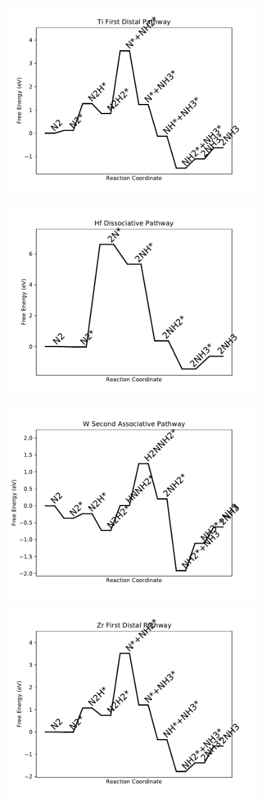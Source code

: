 \documentclass[journal=jacsat,manuscript=article]{achemso}
\begin{document}
\begin{figure}
\includegraphics[width=0.5\linewidth]{data/plots/Ti_distal_1.pdf}
\label{fig:Ti_distal_1}
\end{figure}

\begin{figure}
\includegraphics[width=0.5\linewidth]{data/plots/Hf_dissociative.pdf}
\label{fig:Hf_dissociative}
\end{figure}

\begin{figure}
\includegraphics[width=0.5\linewidth]{data/plots/W_associative_2.pdf}
\label{fig:W_associative_2}
\end{figure}

\begin{figure}
\includegraphics[width=0.5\linewidth]{data/plots/Zr_distal_1.pdf}
\label{fig:Zr_distal_1}
\end{figure}
\end{document}

